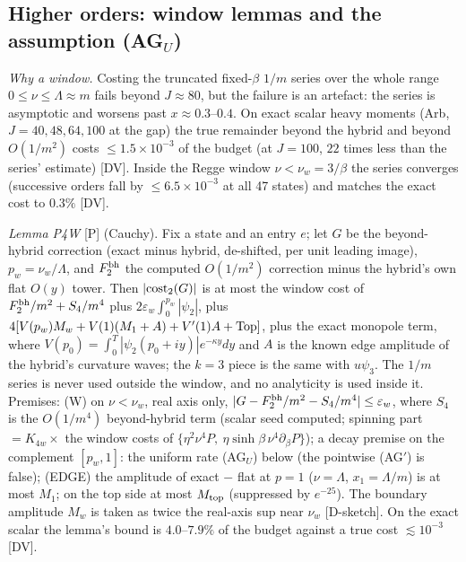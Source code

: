 \documentclass[aps,prl,onecolumn,superscriptaddress,nofootinbib]{revtex4-2}
\begin{document}
\subsection{Higher orders: window lemmas and the assumption (AG\texorpdfstring{$_U$}{\_U})}
\emph{Why a window.} Costing the truncated fixed-$\beta$ $1/m$ series over the whole range $0\le\nu\le\Lambda\approx m$ fails
beyond $J\approx80$, but the failure is an artefact: the series is asymptotic and worsens past $x\approx0.3$--$0.4$. On exact
scalar heavy moments (Arb, $J=40,48,64,100$ at the gap) the true remainder beyond the hybrid and beyond $O(1/m^2)$ costs
$\le1.5\times10^{-3}$ of the budget (at $J=100$, $22$ times less than the series' estimate) [DV]. Inside the Regge window
$\nu<\nu_w=3/\beta$ the series converges (successive orders fall by $\le6.5\times10^{-3}$ at all 47 states) and matches the
exact cost to $0.3\%$ [DV].

\emph{Lemma P4W} [P] (Cauchy). Fix a state and an entry $e$; let $G$ be the beyond-hybrid correction (exact minus hybrid,
de-shifted, per unit leading image), $p_w=\nu_w/\Lambda$, and $F_2^{\rm bh}$ the computed $O(1/m^2)$ correction minus the
hybrid's own flat $O(y)$ tower. Then $|{\rm cost}_2(G)|$ is at most the window cost of $F_2^{\rm bh}/m^2+S_4/m^4$ plus
$2\varepsilon_w\int_0^{p_w}|\psi_2|$, plus $4[V(p_w)M_w+V(1)(M_1+A)+V'(1)A+{\rm Top}]$, plus the exact monopole term, where
$V(p_0)=\int_0^T|\psi_2(p_0+iy)|e^{-\kappa y}dy$ and $A$ is the known edge amplitude of the hybrid's curvature waves;
the $k=3$ piece is the same with $u\psi_3$. The $1/m$ series is never used outside the window, and no analyticity is used
inside it. Premises:
(W) on $\nu<\nu_w$, real axis only, $|G-F_2^{\rm bh}/m^2-S_4/m^4|\le\varepsilon_w$, where $S_4$ is the $O(1/m^4)$ beyond-hybrid term
(scalar seed computed; spinning part $=K_{4w}\times$ the window costs of $\{\eta^2\nu^4P,\ \eta\sinh\beta\,\nu^4\partial_\beta P\}$);
a decay premise on the complement $[p_w,1]$: the uniform rate (AG$_U$) below (the pointwise (AG$'$) is false);
(EDGE) the amplitude of exact $-$ flat at $p=1$ ($\nu=\Lambda$, $x_1=\Lambda/m$) is at most $M_1$; on the top side at most
$M_{\rm top}$ (suppressed by $e^{-25}$).
The boundary amplitude $M_w$ is taken as twice the real-axis sup near $\nu_w$ [D-sketch]. On the exact scalar the lemma's
bound is $4.0$--$7.9\%$ of the budget against a true cost $\lesssim10^{-3}$ [DV].
\end{document}
